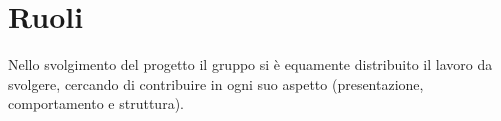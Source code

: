 \section{Ruoli}
Nello svolgimento del progetto il gruppo si è equamente distribuito il lavoro da svolgere, cercando di contribuire in ogni suo aspetto (presentazione, comportamento e struttura).
